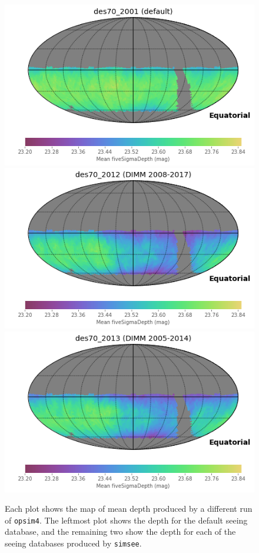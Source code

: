 \documentclass[\docopts]{\docclass}
\begin{document}
\begin{figure}
  \includegraphics[width=\columnwidth]{depth_map_2001.png}
\endminipage\hfill
{}
  \includegraphics[width=\columnwidth]{depth_map_2012.png}
\endminipage\hfill
{}
  \includegraphics[width=\columnwidth]{depth_map_2013.png}
\endminipage\hfill
  \caption{Each plot shows the map of mean depth
    produced by a different run of \texttt{opsim4}. The leftmost plot
    shows the depth for the default seeing database, and the
    remaining two show the depth for each of the seeing databases
    produced by \texttt{simsee}.} 
  \label{fig:simdepthmaps}
\end{figure}
\end{document}
